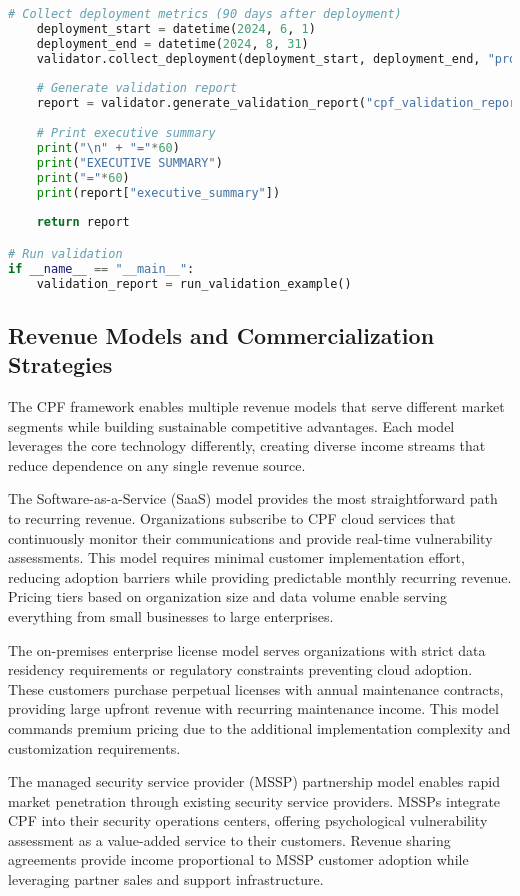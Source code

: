 \documentclass[11pt,a4paper]{article}
\begin{document}
\begin{lstlisting}[language=Python, caption=CPF Validation Framework]
    # Collect deployment metrics (90 days after deployment)
    deployment_start = datetime(2024, 6, 1)
    deployment_end = datetime(2024, 8, 31)
    validator.collect_deployment(deployment_start, deployment_end, "production_db")
    
    # Generate validation report
    report = validator.generate_validation_report("cpf_validation_report.json")
    
    # Print executive summary
    print("\n" + "="*60)
    print("EXECUTIVE SUMMARY")
    print("="*60)
    print(report["executive_summary"])
    
    return report

# Run validation
if __name__ == "__main__":
    validation_report = run_validation_example()
\end{lstlisting}

\subsection{Revenue Models and Commercialization Strategies}

The CPF framework enables multiple revenue models that serve different market segments while building sustainable competitive advantages. Each model leverages the core technology differently, creating diverse income streams that reduce dependence on any single revenue source.

The Software-as-a-Service (SaaS) model provides the most straightforward path to recurring revenue. Organizations subscribe to CPF cloud services that continuously monitor their communications and provide real-time vulnerability assessments. This model requires minimal customer implementation effort, reducing adoption barriers while providing predictable monthly recurring revenue. Pricing tiers based on organization size and data volume enable serving everything from small businesses to large enterprises.

The on-premises enterprise license model serves organizations with strict data residency requirements or regulatory constraints preventing cloud adoption. These customers purchase perpetual licenses with annual maintenance contracts, providing large upfront revenue with recurring maintenance income. This model commands premium pricing due to the additional implementation complexity and customization requirements.

The managed security service provider (MSSP) partnership model enables rapid market penetration through existing security service providers. MSSPs integrate CPF into their security operations centers, offering psychological vulnerability assessment as a value-added service to their customers. Revenue sharing agreements provide income proportional to MSSP customer adoption while leveraging partner sales and support infrastructure.
\end{document}
